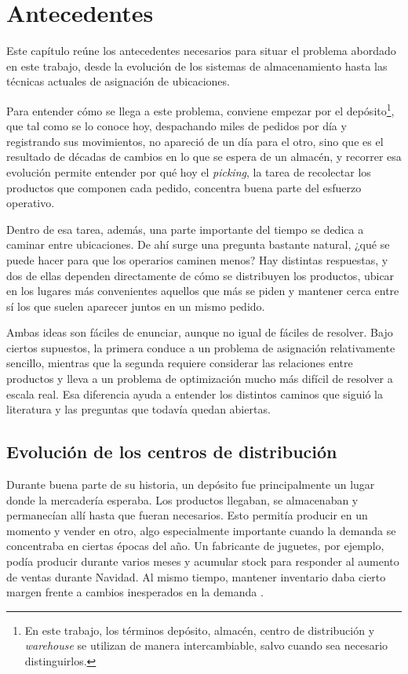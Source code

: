 \chapter{Antecedentes}
\label{chapter:antecedentes}

Este capítulo reúne los antecedentes necesarios para situar el problema abordado en este trabajo, desde la evolución de los sistemas de almacenamiento hasta las técnicas actuales de asignación de ubicaciones.

Para entender cómo se llega a este problema, conviene empezar por el depósito\footnote{En este trabajo, los términos depósito, almacén, centro de distribución y \emph{warehouse} se utilizan de manera intercambiable, salvo cuando sea necesario distinguirlos.}, que tal como se lo conoce hoy, despachando miles de pedidos por día y registrando sus movimientos, no apareció de un día para el otro, sino que es el resultado de décadas de cambios en lo que se espera de un almacén, y recorrer esa evolución permite entender por qué hoy el \emph{picking}, la tarea de recolectar los productos que componen cada pedido, concentra buena parte del esfuerzo operativo.

Dentro de esa tarea, además, una parte importante del tiempo se dedica a caminar entre ubicaciones.
De ahí surge una pregunta bastante natural, ¿qué se puede hacer para que los operarios caminen menos?
Hay distintas respuestas, y dos de ellas dependen directamente de cómo se distribuyen los productos, ubicar en los lugares más convenientes aquellos que más se piden y mantener cerca entre sí los que suelen aparecer juntos en un mismo pedido.

Ambas ideas son fáciles de enunciar, aunque no igual de fáciles de resolver.
Bajo ciertos supuestos, la primera conduce a un problema de asignación relativamente sencillo, mientras que la segunda requiere considerar las relaciones entre productos y lleva a un problema de optimización mucho más difícil de resolver a escala real.
Esa diferencia ayuda a entender los distintos caminos que siguió la literatura y las preguntas que todavía quedan abiertas.




\section{Evolución de los centros de distribución}
\label{sec:evolucion}


Durante buena parte de su historia, un depósito fue principalmente un lugar donde la mercadería esperaba.
Los productos llegaban, se almacenaban y permanecían allí hasta que fueran necesarios. Esto permitía producir en un momento y vender en otro, algo especialmente importante cuando la demanda se concentraba en ciertas épocas del año. Un fabricante de juguetes, por ejemplo, podía producir durante varios meses y acumular stock para responder al aumento de ventas durante Navidad. Al mismo tiempo, mantener inventario daba cierto margen frente a cambios inesperados en la demanda \citep[sección~1.1]{bartholdi2014warehouse}.

